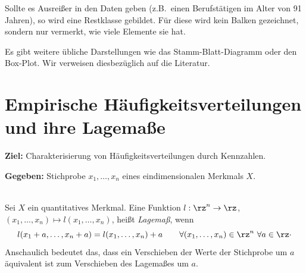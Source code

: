 \begin{bem}[Restklasse]
    Sollte es Ausreißer in den Daten geben (z.B.\ einen Berufstätigen im Alter von 91 Jahren), so wird eine Restklasse gebildet.
    Für diese wird kein Balken gezeichnet, sondern nur vermerkt, wie viele Elemente sie hat.
\end{bem}

Es gibt weitere übliche Darstellungen wie das Stamm-Blatt-Diagramm oder den Box-Plot.
Wir verweisen diesbezüglich auf die Literatur.


\section{Empirische Häufigkeitsverteilungen und ihre Lagemaße}\label{sec:empirische-haufigkeitsverteilungen-und-ihre-lagemae}

\noindent \textbf{Ziel:} Charakterisierung von \gls{Häufigkeitsverteilung}en durch Kennzahlen.

\noindent \textbf{Gegeben:} Stichprobe $x_1,\dots,x_n$ eines eindimensionalen \gls{Merkmal}s $X$.

\begin{defi}\label{def:lagemaß}   \\
    Sei $X$ ein quantitatives \gls{Merkmal}.
    Eine Funktion $l:\rz^n\to\rz$, $(x_1,\dots,x_n)\mapsto l(x_1,\dots,x_n)$, heißt \emph{Lagemaß}, wenn
    \[
        l(x_1+a,\dots,x_n+a) = l(x_1,\dots,x_n) + a \qquad \forall (x_1,\dots,x_n)\in\rz^n \ \forall a\in\rz \cdot
    \]
    Anschaulich bedeutet das, dass ein Verschieben der Werte der Stichprobe um $a$ äquivalent ist zum Verschieben des \gls{Lagemaß}es um $a$.
\end{defi}

